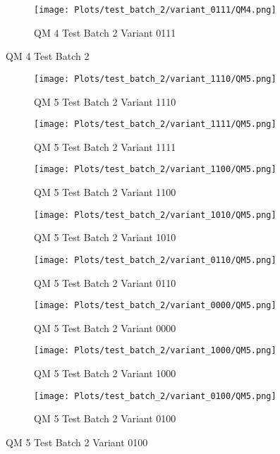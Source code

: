 \documentclass{DissertateFigs}
\begin{document}
\begin{figure}[t!]
\medskip

    \begin{subfigure}{0.47\textwidth}
    \texttt{[image: Plots/test\_batch\_2/variant\_0111/QM4.png]}
    \caption{QM 4 Test Batch 2 Variant 0111}
    \end{subfigure}
\caption{QM 4 Test Batch 2}
    \end{figure}
\clearpage
\begin{figure}[t!]
    \begin{subfigure}{0.47\textwidth}
    \texttt{[image: Plots/test\_batch\_2/variant\_1110/QM5.png]}
    \caption{QM 5 Test Batch 2 Variant 1110}
    \end{subfigure}
    \begin{subfigure}{0.47\textwidth}
    \texttt{[image: Plots/test\_batch\_2/variant\_1111/QM5.png]}
    \caption{QM 5 Test Batch 2 Variant 1111}
    \end{subfigure}

\medskip

    \begin{subfigure}{0.47\textwidth}
    \texttt{[image: Plots/test\_batch\_2/variant\_1100/QM5.png]}
    \caption{QM 5 Test Batch 2 Variant 1100}
    \end{subfigure}
    \begin{subfigure}{0.47\textwidth}
    \texttt{[image: Plots/test\_batch\_2/variant\_1010/QM5.png]}
    \caption{QM 5 Test Batch 2 Variant 1010}
    \end{subfigure}

\medskip

    \begin{subfigure}{0.47\textwidth}
    \texttt{[image: Plots/test\_batch\_2/variant\_0110/QM5.png]}
    \caption{QM 5 Test Batch 2 Variant 0110}
    \end{subfigure}
    \begin{subfigure}{0.47\textwidth}
    \texttt{[image: Plots/test\_batch\_2/variant\_0000/QM5.png]}
    \caption{QM 5 Test Batch 2 Variant 0000}
    \end{subfigure}

\medskip

    \begin{subfigure}{0.47\textwidth}
    \texttt{[image: Plots/test\_batch\_2/variant\_1000/QM5.png]}
    \caption{QM 5 Test Batch 2 Variant 1000}
    \end{subfigure}
    \begin{subfigure}{0.47\textwidth}
    \texttt{[image: Plots/test\_batch\_2/variant\_0100/QM5.png]}
    \caption{QM 5 Test Batch 2 Variant 0100}
    \end{subfigure}


\end{figure}
\end{document}
